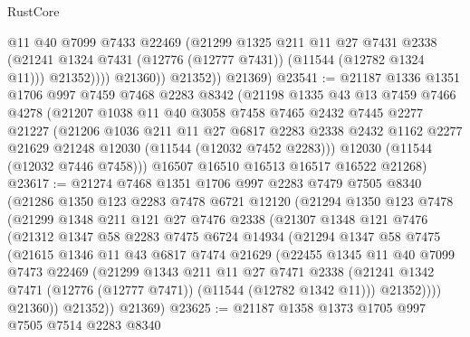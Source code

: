 \begin{lexlean}{RustCore}
\begin{coremodule}
                    @11
                    @40
                    @7099
                    @7433
                    @22469
                    (@21299
                      @1325
                      @211
                      @11
                      @27
                      @7431
                      @2338
                      (@21241 @1324 @7431 (@12776 (@12777 @7431)) (@11544 (@12782 @1324 @11)))
                      @21352))))
              @21360))
          @21352))
      @21369)
@23541 := @21187
    @1336
    @1351
    @1706
    @997
    @7459
    @7468
    @2283
    @8342
    (@21198
      @1335
      @43
      @13
      @7459
      @7466
      @4278
      (@21207
        @1038
        @11
        @40
        @3058
        @7458
        @7465
        @2432
        @7445
        @2277
        @21227
        (@21206
          @1036
          @211
          @11
          @27
          @6817
          @2283
          @2338
          @2432
          @1162
          @2277
          @21629
          @21248
          @12030
          (@11544 (@12032 @7452 @2283)))
        @12030
        (@11544 (@12032 @7446 @7458)))
      @16507
      @16510
      @16513
      @16517
      @16522
      @21268)
@23617 := @21274
    @7468
    @1351
    @1706
    @997
    @2283
    @7479
    @7505
    @8340
    (@21286
      @1350
      @123
      @2283
      @7478
      @6721
      @12120
      (@21294
        @1350
        @123
        @7478
        (@21299
          @1348
          @211
          @121
          @27
          @7476
          @2338
          (@21307
            @1348
            @121
            @7476
            (@21312
              @1347
              @58
              @2283
              @7475
              @6724
              @14934
              (@21294
                @1347
                @58
                @7475
                (@21615
                  @1346
                  @11
                  @43
                  @6817
                  @7474
                  @21629
                  (@22455
                    @1345
                    @11
                    @40
                    @7099
                    @7473
                    @22469
                    (@21299
                      @1343
                      @211
                      @11
                      @27
                      @7471
                      @2338
                      (@21241 @1342 @7471 (@12776 (@12777 @7471)) (@11544 (@12782 @1342 @11)))
                      @21352))))
              @21360))
          @21352))
      @21369)
@23625 := @21187 @1358 @1373 @1705 @997 @7505 @7514 @2283 @8340

\end{coremodule}
\end{lexlean}
